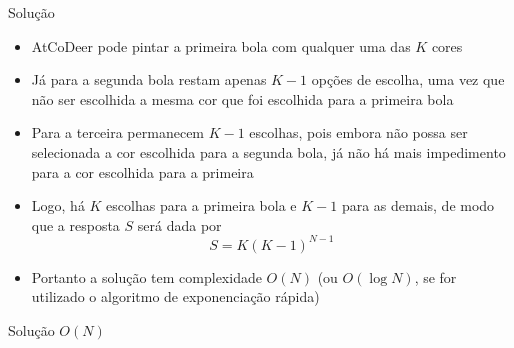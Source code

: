\begin{frame}[fragile]{Solução}

    \begin{itemize}
        \item AtCoDeer pode pintar a primeira bola com qualquer uma das $K$ cores

        \item Já para a segunda bola restam apenas $K - 1$ opções de escolha, uma vez que não ser
            escolhida a mesma cor que foi escolhida para a primeira bola

        \item Para a terceira permanecem $K - 1$ escolhas, pois embora não possa ser selecionada
            a cor escolhida para a segunda bola, já não há mais impedimento para a cor escolhida
            para a primeira

        \item Logo, há $K$ escolhas para a primeira bola e $K - 1$ para as demais, de modo que
            a resposta $S$ será dada por
        \[
            S = K(K - 1)^{N - 1}
        \]

        \item Portanto a solução tem complexidade $O(N)$ (ou $O(\log N)$, se for utilizado o
            algoritmo de exponenciação rápida)
    \end{itemize}

\end{frame}

\begin{frame}[fragile]{Solução $O(N)$}
\end{frame}
